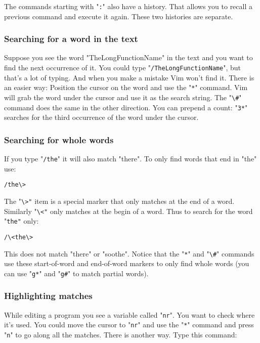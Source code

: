 The commands starting with "\verb!:!" also have a history.
That allows you to recall a previous command and execute it again.
These two histories are separate.

\subsubsection{Searching for a word in the text}

Suppose you see the word "TheLongFunctionName" in the text and you want to find the next occurrence of it.
You could type "\verb!/TheLongFunctionName!", but that's a lot of typing.
And when you make a mistake Vim won't find it.
There is an easier way: Position the cursor on the word and use the "\verb!*!" command.
Vim will grab the word under the cursor and use it as the search string.
The "\verb!\#!" command does the same in the other direction.
You can prepend a count: "\verb!3*!" searches for the third occurrence of the word under the cursor.

\subsubsection{Searching for whole words}

If you type "\verb!/the!" it will also match "there".
To only find words that end in "the" use:

 \begin{Verbatim}[samepage=true]
 /the\>
 \end{Verbatim}

The "\verb!\>"! item is a special marker that only matches at the end of a word.
Similarly "\verb!\<"! only matches at the begin of a word.
Thus to search for the word "\verb!the"! only:

 \begin{Verbatim}[samepage=true]
 /\<the\>
 \end{Verbatim}

This does not match "there" or "soothe".
Notice that the "\verb!*!" and "\verb!\#!" commands use these start-of-word and end-of-word markers to only find whole words (you can use "\verb!g*!" and "\verb!g#!" to match partial words).

\subsubsection{Highlighting matches}

While editing a program you see a variable called "\verb!nr!".
You want to check where it's used.
You could move the cursor to "\verb!nr!" and use the "\verb!*!" command and press "\verb!n!" to go along all the matches.
There is another way.
Type this command:


